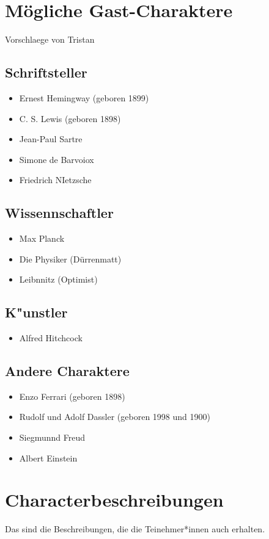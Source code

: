 \documentclass[12pt, a4paper, openany]{report}
\begin{document}
\section{Mögliche Gast-Charaktere}
Vorschlaege von Tristan
\subsection{Schriftsteller}
\begin{itemize}
    \item Ernest Hemingway (geboren 1899)
    \item C. S. Lewis (geboren 1898)
    \item Jean-Paul Sartre
    \item Simone de Barvoiox
    \item Friedrich NIetzsche
\end{itemize}

\subsection{Wissennschaftler}
\begin{itemize}
	\item Max Planck
	\item Die Physiker (Dürrenmatt)
	\item Leibnnitz (Optimist)
\end{itemize}

\subsection{K"unstler}
\begin{itemize}
	\item Alfred Hitchcock
\end{itemize}

\subsection{Andere Charaktere}
\begin{itemize}
	\item Enzo Ferrari (geboren 1898)
	\item Rudolf und Adolf Dassler (geboren 1998 und 1900)
	\item Siegmunnd Freud
	\item Albert Einstein
\end{itemize}
\section{Characterbeschreibungen}
Das sind die Beschreibungen, die die Teinehmer*innen auch erhalten.
\end{document}
